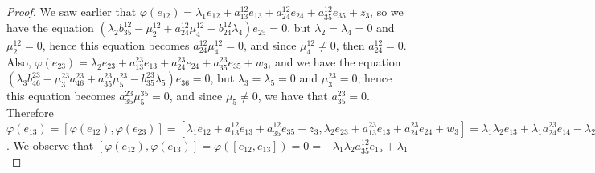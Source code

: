 \documentclass[12pt,fleqn]{article}
\begin{document}
\begin{proof}
We saw earlier that $\varphi(e_{12})=\lambda_1 e_{12}+a_{13}^{12}e_{13}+a_{24}^{12}e_{24}+a_{35}^{12}e_{35}+z_3$, so we have the equation $(\lambda_2 b_{35}^{12}-\mu_2^{12}+a_{24}^{12}\mu_4^{12}-b_{24}^{12}\lambda_4)e_{25}=0$, but $\lambda_2=\lambda_4=0$ and $\mu_2^{12}=0$, hence this equation becomes $a_{24}^{12}\mu_4^{12}=0$, and since $\mu_4^{12}\neq 0$, then $a_{24}^{12}=0$. Also, $\varphi(e_{23})=\lambda_2 e_{23}+a_{13}^{23}e_{13}+a_{24}^{23}e_{24}+a_{35}^{23}e_{35}+w_3$, and we have the equation $(\lambda_3 b_{46}^{23}-\mu_3^{23}a_{46}^{23}+a_{35}^{23}\mu_5^{23}-b_{35}^{23}\lambda_5)e_{36}=0$, but $\lambda_3=\lambda_5=0$ and $\mu_3^{23}=0$, hence this equation becomes $a_{35}^{23}\mu_5^{35}=0$, and since $\mu_5\neq 0$, we have that $a_{35}^{23}=0$. Therefore $\varphi(e_{13})=[\varphi(e_{12}),\varphi(e_{23})]=[\lambda_1 e_{12}+a_{13}^{12}e_{13}+a_{35}^{12}e_{35}+z_3,\lambda_2 e_{23}+a_{13}^{23}e_{13}+a_{24}^{23}e_{24}+w_3]=\lambda_1\lambda_2 e_{13}+\lambda_1 a_{24}^{23}e_{14}-\lambda_2 a_{35}^{12}e_{25}-a_{35}^{12}a_{13}^{23}e_{15}+u_4$. We observe that $[\varphi(e_{12}),\varphi(e_{13})]=\varphi([e_{12},e_{13}])=0=-\lambda_1\lambda_2 a_{35}^{12}e_{15}+\lambda_1$ 


















\end{proof}
\end{document}
